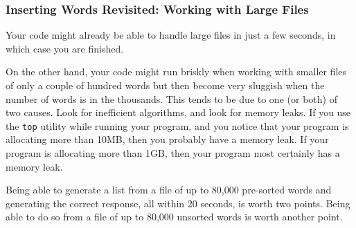 \subsubsection{Inserting Words Revisited: Working with Large Files}

Your code might already be able to handle large files in just a few seconds, in which case you are finished.

On the other hand, your code might run briskly when working with smaller files of only a couple of hundred words but then become very sluggish when the number of words is in the thousands.
This tends to be due to one (or both) of two causes.
Look for inefficient algorithms, and look for memory leaks.
If you use the \texttt{top} utility while running your program, and you notice that your program is allocating more than 10MB, then you probably have a memory leak.
If your program is allocating more than 1GB, then your program most certainly has a memory leak.

Being able to generate a list from a file of up to 80,000 pre-sorted words and generating the correct response, all within 20 seconds, is worth two points.
Being able to do so from a file of up to 80,000 unsorted words is worth another point.
